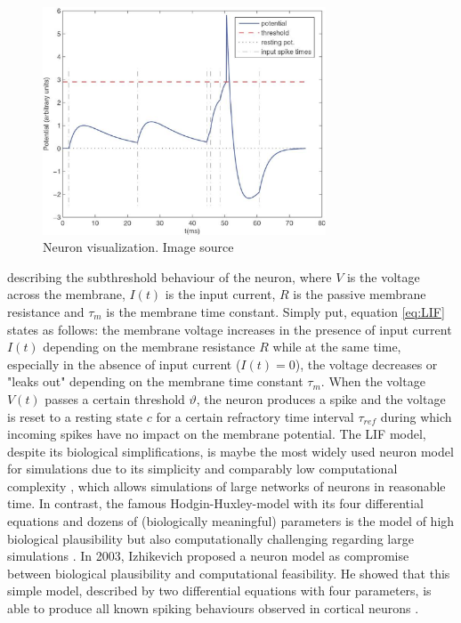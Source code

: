 \begin{figure}
	\centering
	\includegraphics[width=0.75\textwidth]{imgs/LIF_Neuron.eps}
	\caption{Neuron visualization. Image source \cite{Masquelier2007}}
	\label{fig:lif_neuron_model}
\end{figure}
describing the subthreshold behaviour of the neuron, where $V$ is the voltage across the membrane, $I(t)$ is the input current, $R$ is the passive membrane resistance and $\tau_{m}$ is the membrane time constant.
Simply put, equation \ref{eq:LIF} states as follows: the membrane voltage increases in the presence of input current $I(t)$ depending on the membrane resistance $R$ while at the same time, especially in the absence of input current ($I(t)=0$), the voltage decreases or "leaks out" depending on the membrane time constant $\tau_{m}$.
When the voltage $V(t)$ passes a certain threshold $\vartheta$, the neuron produces a spike and the voltage is reset to a resting state $c$ for a certain refractory time interval $\tau_{ref}$ during which incoming spikes have no impact on the membrane potential.
The \ac{LIF} model, despite its biological simplifications, is maybe the most widely used neuron model for simulations due to its simplicity and comparably low computational complexity \cite{Izhikevich2004}, which allows simulations of large networks of neurons in reasonable time.
In contrast, the famous Hodgin-Huxley-model \cite{Hodgkin1952} with its four differential equations and dozens of (biologically meaningful) parameters is the model of high biological plausibility but also computationally challenging regarding large simulations \cite{Izhikevich2004}.
In 2003, Izhikevich proposed a neuron model \cite{Izhikevich2003} as compromise between biological plausibility and computational feasibility.
He showed that this simple model, described by two differential equations with four parameters, is able to produce all known spiking behaviours observed in cortical neurons \cite{Izhikevich2004}. 

